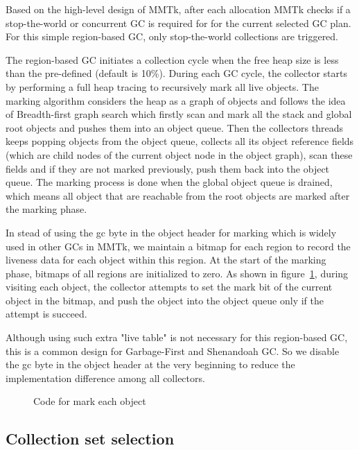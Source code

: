 Based on the high-level design of MMTk, after each allocation MMTk checks if a stop-the-world
or concurrent GC is required for for the current selected GC plan.
For this simple region-based GC, only stop-the-world collections are triggered.

The region-based GC initiates a collection cycle when the free heap size is less than
the pre-defined  (default is 10\%). During each GC cycle,
the collector starts by performing a full heap tracing to recursively mark all live objects.
The marking algorithm considers the heap as a graph of objects and follows the idea of Breadth-first graph search
which firstly scan and mark all the stack and global root objects and pushes them into an object queue.
Then the collectors threads keeps popping objects from the object queue, collects all its
object reference fields (which are child nodes of the current object node in the object graph), scan these
fields and if they are not marked previously, push them back into the object queue.
The marking process is done when the global object queue is drained, which means all object that are reachable
from the root objects are marked after the marking phase.

In stead of using the gc byte in the object header for marking which is widely used in other GCs in MMTk,
we maintain a bitmap for each region to record the liveness data for each object within this region.
At the start of the marking phase, bitmaps of all regions are initialized to zero.
As shown in figure~\ref{fig:tracemarkobject}, during visiting each object, the collector attempts to set the mark bit
of the current object in the bitmap, and push the object into the object queue only if the attempt is succeed.

Although using such extra "live table" is not necessary for this region-based GC,
this is a common design for Garbage-First and Shenandoah GC.
So we disable the gc byte in the object header at the very beginning to reduce the implementation difference among all collectors.

\begin{figure}
  \centering
  
  \caption{Code for mark each object}
  \label{fig:tracemarkobject}
\end{figure}

\subsection{Collection set selection}

